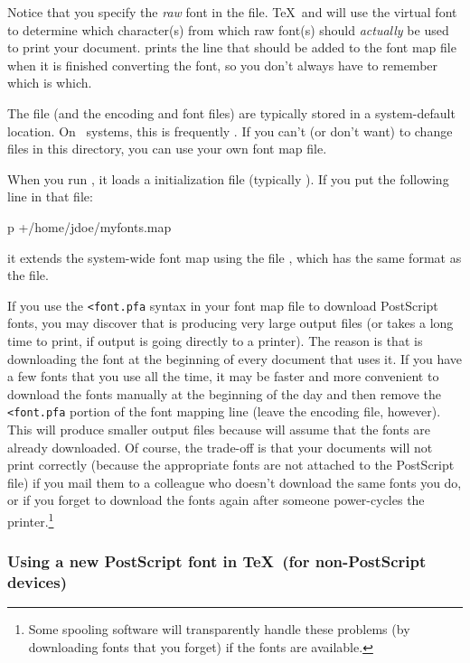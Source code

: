 Notice that you specify the \emph{raw} font in the 
file.  \TeX\ and  will use the virtual font to determine
which character(s) from which raw font(s) should \emph{actually} be used
to print your document.   prints the line that should
be added to the font map file when it is finished converting the font,
so you don't always have to remember which is which.

The  file (and the encoding and font files) are
typically stored in a system-default location.  On \Unix\ systems,
this is frequently .  If you
can't (or don't want) to change files in this directory, you can use
your own font map file. 

When you run , it loads a initialization file 
(typically ).  
If you put the following line in that file:

\begin{shortexample}
p +/home/jdoe/myfonts.map
\end{shortexample}

it extends the system-wide font map using the file
, which has the same format as the
 file.

\newpage
If you use the \verb|<font.pfa| syntax in your font map file to download
PostScript fonts, you may discover that  is producing very
large output files (or takes a long time to print, if output is going
directly to a printer).  The reason is that  is downloading
the font at the beginning of every document that uses it.  If you have
a few fonts that you use all the time, it may be faster and more convenient
to download the fonts manually at the beginning of the day and then remove
the \verb|<font.pfa| portion of the font mapping line (leave the 
encoding file, however).  This will produce smaller output files because
 will assume that the fonts are already downloaded.
Of course, the trade-off is that your documents will not print correctly
(because the appropriate fonts are not attached to the PostScript file)
if you mail them to a colleague who doesn't download the same fonts you
do, or if you forget to download the fonts again after someone power-cycles
the printer.\footnote{Some spooling software will transparently handle
these problems (by downloading fonts that you forget) if the fonts
are available.}

\subsubsection{Using a new PostScript font in \protect\TeX\ (for
non-PostScript devices)}


